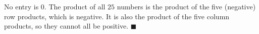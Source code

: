 No entry is $0$. The product of all $25$ numbers is the product of the five (negative) row products, which is negative. It is also the product of the five column products, so they cannot all be positive. $\blacksquare$

